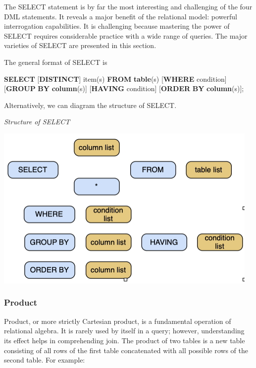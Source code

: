 \documentclass[
]{article}
\newenvironment{Shaded}{\begin{snugshade}}{\end{snugshade}}
\newcommand{\KeywordTok}[1]{\textcolor[rgb]{0.13,0.29,0.53}{\textbf{#1}}}
\newcommand{\NormalTok}[1]{#1}
\begin{document}
The SELECT statement is by far the most interesting and challenging of
the four DML statements. It reveals a major benefit of the relational
model: powerful interrogation capabilities. It is challenging because
mastering the power of SELECT requires considerable practice with a wide
range of queries. The major varieties of SELECT are presented in this
section.

The general format of SELECT is

\begin{Shaded}
\begin{Highlighting}[]
\KeywordTok{SELECT}\NormalTok{ [}\KeywordTok{DISTINCT}\NormalTok{] item(s) }\KeywordTok{FROM} \KeywordTok{table}\NormalTok{(s)}
\NormalTok{    [}\KeywordTok{WHERE}\NormalTok{ condition]}
\NormalTok{    [}\KeywordTok{GROUP} \KeywordTok{BY} \KeywordTok{column}\NormalTok{(s)] [}\KeywordTok{HAVING}\NormalTok{ condition]}
\NormalTok{    [}\KeywordTok{ORDER} \KeywordTok{BY} \KeywordTok{column}\NormalTok{(s)];}
\end{Highlighting}
\end{Shaded}

Alternatively, we can diagram the structure of SELECT.

\emph{Structure of SELECT}

\includegraphics{Figures/Chapter 10/select structure.png}

\hypertarget{product}{%
\subsubsection*{Product}\label{product}}

Product, or more strictly Cartesian product, is a fundamental operation
of relational algebra. It is rarely used by itself in a query; however,
understanding its effect helps in comprehending join. The product of two
tables is a new table consisting of all rows of the first table
concatenated with all possible rows of the second table. For example:
\end{document}
